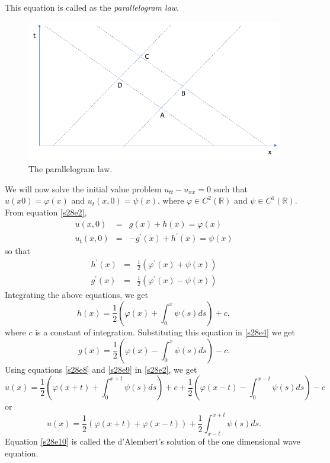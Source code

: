 \documentclass{article}
\theoremstyle{plain}
\numberwithin{thm}{section}
\theoremstyle{plain}
\numberwithin{prop}{section}
\theoremstyle{definition}
\numberwithin{defn}{section}
\theoremstyle{remark}
\numberwithin{equation}{section}
\begin{document}
This equation is called as the \emph{parallelogram law}.
\begin{figure}
\centering
\includegraphics[scale=0.5]{s28_f1}
\caption{The parallelogram law.}
\label{s28f1}
\end{figure}

We will now solve the initial value problem $u_{tt} - u_{xx} = 0$ such that $u(x 0) = \varphi(x)$ and 
$u_t(x, 0) = \psi(x)$, where $\varphi \in C^2(\mathbb{R})$ and $\psi \in C^1(\mathbb{R})$. From equation 
\eqref{s28e2}, 
\begin{eqnarray}
u(x, 0) &=& g(x) + h(x) = \varphi(x) \label{s28e4} \\
u_t(x, 0) &=& -g^\prime(x) + h^\prime(x)  = \psi(x) \label{s28e5}
\end{eqnarray}
so that
\begin{eqnarray}
h^\prime(x) &=& \frac{1}{2}(\varphi^\prime(x) + \psi(x)) \label{s28e6} \\
g^\prime(x) &=& \frac{1}{2}(\varphi^\prime(x) - \psi(x)) \label{s28e7}
\end{eqnarray}
Integrating the above equations, we get
\begin{equation}\label{s28e8}
h(x) = \frac{1}{2}\left(\varphi(x) + \int_0^x\psi(s)ds\right) + c,
\end{equation}
where $c$ is a constant of integration. Substituting this equation in \eqref{s28e4} we get
\begin{equation}\label{s28e9}
g(x) = \frac{1}{2}\left(\varphi(x) - \int_0^x\psi(s)ds\right) - c.
\end{equation}
Using equations \eqref{s28e8} and \eqref{s28e9} in \eqref{s28e2}, we get
\[
u(x) = \frac{1}{2}\left(\varphi(x + t) + \int_0^{x+t}\psi(s)ds\right) + c +
\frac{1}{2}\left(\varphi(x - t) - \int_0^{x-t}\psi(s)ds\right) - c
\]
or
\begin{equation}\label{s28e10}
u(x) = \frac{1}{2}(\varphi(x+t) + \varphi(x-t)) + \frac{1}{2}\int_{x-t}^{x+t}\psi(s)ds.
\end{equation}
Equation \eqref{s28e10} is called the d'Alembert's solution of the one dimensional wave equation.
\end{document}
